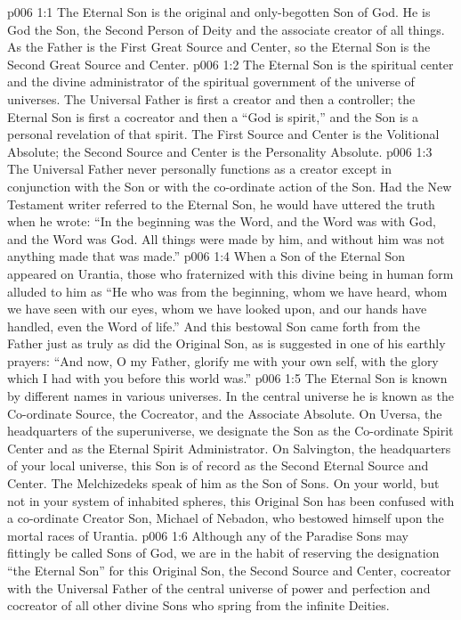 \vs p006 1:1 The Eternal Son is the original and only\hyp{}begotten Son of God. He is God the Son, the Second Person of Deity and the associate creator of all things. As the Father is the First Great Source and Center, so the Eternal Son is the Second Great Source and Center.
\vs p006 1:2 The Eternal Son is the spiritual center and the divine administrator of the spiritual government of the universe of universes. The Universal Father is first a creator and then a controller; the Eternal Son is first a cocreator and then a  “God is spirit,” and the Son is a personal revelation of that spirit. The First Source and Center is the Volitional Absolute; the Second Source and Center is the Personality Absolute.
\vs p006 1:3 The Universal Father never personally functions as a creator except in conjunction with the Son or with the co\hyp{}ordinate action of the Son. Had the New Testament writer referred to the Eternal Son, he would have uttered the truth when he wrote: “In the beginning was the Word, and the Word was with God, and the Word was God. All things were made by him, and without him was not anything made that was made.”
\vs p006 1:4 When a Son of the Eternal Son appeared on Urantia, those who fraternized with this divine being in human form alluded to him as “He who was from the beginning, whom we have heard, whom we have seen with our eyes, whom we have looked upon, and our hands have handled, even the Word of life.” And this bestowal Son came forth from the Father just as truly as did the Original Son, as is suggested in one of his earthly prayers: \textcolor{ubdarkred}{“And now, O my Father, glorify me with your own self, with the glory which I had with you before this world was.”}
\vs p006 1:5 \pc The Eternal Son is known by different names in various universes. In the central universe he is known as the Co\hyp{}ordinate Source, the Cocreator, and the Associate Absolute. On Uversa, the headquarters of the superuniverse, we designate the Son as the Co\hyp{}ordinate Spirit Center and as the Eternal Spirit Administrator. On Salvington, the headquarters of your local universe, this Son is of record as the Second Eternal Source and Center. The Melchizedeks speak of him as the Son of Sons. On your world, but not in your system of inhabited spheres, this Original Son has been confused with a co\hyp{}ordinate Creator Son, Michael of Nebadon, who bestowed himself upon the mortal races of Urantia.
\vs p006 1:6 Although any of the Paradise Sons may fittingly be called Sons of God, we are in the habit of reserving the designation “the Eternal Son” for this Original Son, the Second Source and Center, cocreator with the Universal Father of the central universe of power and perfection and cocreator of all other divine Sons who spring from the infinite Deities.
